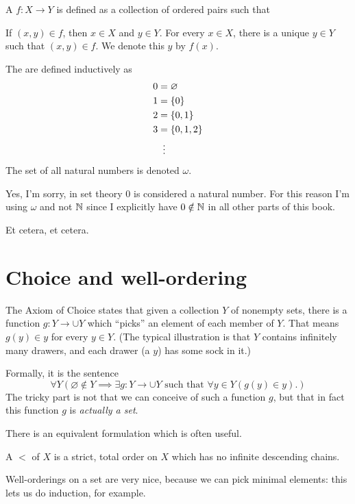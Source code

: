 \begin{definition}
	A  $f \colon X \to Y$
	is defined as a collection of ordered pairs such that
	\begin{itemize}
		\ii If $(x,y) \in f$, then $x \in X$ and $y \in Y$.
		\ii For every $x \in X$, there is a unique $y \in Y$
		such that $(x,y) \in f$. We denote this $y$ by $f(x)$.
	\end{itemize}
\end{definition}

\begin{definition}
	The  are defined inductively as
	\begin{align*}
		0 &= \varnothing \\
		1 &= \{0\} \\
		2 &= \{0,1\} \\
		3 &= \{0,1,2\} \\
		&\vdotswithin=
	\end{align*}
	The set of all natural numbers is denoted $\omega$.
\end{definition}
\begin{abuse}
	Yes, I'm sorry, in set theory $0$ is considered a natural number.
	For this reason I'm using $\omega$ and not $\mathbb N$
	since I explicitly have $0\notin\mathbb N$ in all other parts of this book.
\end{abuse}

Et cetera, et cetera.

\section{Choice and well-ordering}
The Axiom of Choice states that given a collection $Y$ of nonempty sets,
there is a function $g \colon Y \to \cup Y$ which ``picks'' an element of each member of $Y$.
That means $g(y) \in y$ for every $y \in Y$.
(The typical illustration is that $Y$ contains infinitely many drawers,
and each drawer (a $y$) has some sock in it.)

Formally, it is the sentence
\[ \forall Y \left(\varnothing \notin Y
	\implies
	\exists g \colon Y \to \cup Y
	\text{ such that }
	\forall y \in Y \left( g(y) \in y \right).
	\right)
\]
The tricky part is not that we can conceive of such a function $g$,
but that in fact this function $g$ is \emph{actually a set}.

There is an equivalent formulation which is often useful.
\begin{definition}
	A  $<$ of $X$ is a strict, total order on $X$
	which has no infinite descending chains.
\end{definition}
Well-orderings on a set are very nice, because we can pick minimal elements:
this lets us do induction, for example.

